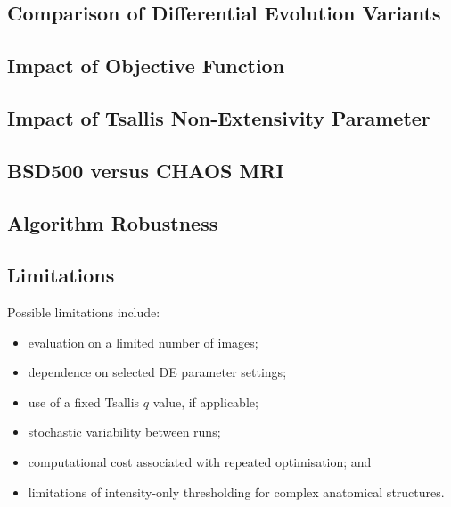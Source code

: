 \documentclass[review]{elsarticle}
\begin{document}
\subsection{Comparison of Differential Evolution Variants}

%
%
%
%
%


\subsection{Impact of Objective Function}



\subsection{Impact of Tsallis Non-Extensivity Parameter}

%


\subsection{BSD500 versus CHAOS MRI}



\subsection{Algorithm Robustness}



\subsection{Limitations}

Possible limitations include:

\begin{itemize}
    \item evaluation on a limited number of images;
    \item dependence on selected DE parameter settings;
    \item use of a fixed Tsallis $q$ value, if applicable;
    \item stochastic variability between runs;
    \item computational cost associated with repeated optimisation; and
    \item limitations of intensity-only thresholding for complex
          anatomical structures.
\end{itemize}
\end{document}
